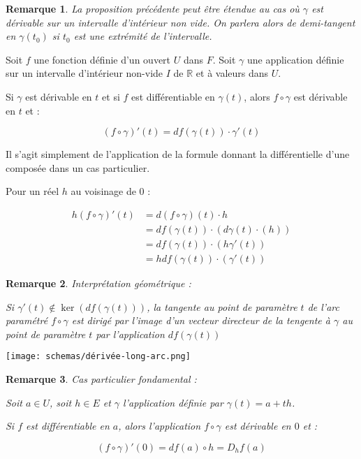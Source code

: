 \documentclass[a4paper,12pt]{book}
\newcommand{\Prop}[2]{\begin{tcolorbox}[sharp corners, colback=white,colframe=red!90!black!75, title=Proposition : #1]#2\end{tcolorbox}}
\newcommand{\Pre}[1]{\begin{tcolorbox}[sharp corners, colback=white,colframe=green!60!green!30!black!75, title=Preuve]#1\end{tcolorbox}}
\newtheorem{Rem}{Remarque}[section]
\def\R{\mathbb{R}}
\begin{document}
\begin{Rem}
La proposition précédente peut être étendue au cas où $\gamma$ est dérivable sur un intervalle d'intérieur non vide. On parlera alors de demi-tangent en $\gamma(t_0)$ si $t_0$ est une extrémité de l'intervalle.
\end{Rem}
\Prop{Dérivée le long d'un arc}{Soit $f$ une fonction définie d'un ouvert $U$ dans $F$. Soit $\gamma$ une application définie sur un intervalle d'intérieur non-vide $I$ de $\R$ et à valeurs dans $U$.
\par Si $\gamma$ est dérivable en $t$ et si $f$ est différentiable en $\gamma(t)$, alors $f\circ\gamma$ est dérivable en $t$ et :
\par $$(f\circ\gamma)'(t) = df(\gamma(t))\cdot\gamma'(t)$$}
\Pre{Il s'agit simplement de l'application de la formule donnant la différentielle d'une composée dans un cas particulier.
\par Pour un réel $h$ au voisinage de $0$ :
\par \begin{align*}h(f\circ\gamma)'(t)&=d(f\circ\gamma)(t)\cdot h\\
&= df(\gamma(t))\cdot (d\gamma(t)\cdot(h))\\
&= df(\gamma(t))\cdot(h\gamma'(t))\\
&= hdf(\gamma(t))\cdot(\gamma'(t))\end{align*}}
\begin{Rem}
Interprétation géométrique :
\par Si $\gamma'(t)\notin\ker(df(\gamma(t)))$, la tangente au point de paramètre $t$ de l'arc paramétré $f\circ\gamma$ est dirigé par l'image d'un vecteur directeur de la tengente à $\gamma$ au point de paramètre $t$ par l'application $df(\gamma(t))$
\end{Rem}
\texttt{[image: schemas/dérivée-long-arc.png]}
\begin{Rem}
Cas particulier fondamental :
\par Soit $a\in U$, soit $h\in E$ et $\gamma$ l'application définie par $\gamma(t) = a+th$.
\par Si $f$ est différentiable en $a$, alors l'application $f\circ\gamma$ est dérivable en $0$ et :
\par $$(f\circ\gamma)'(0) =df(a)\circ h=D_hf(a)$$  
\end{Rem}
\end{document}
